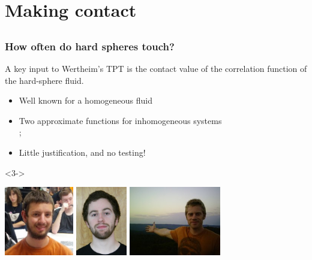 \section{Making contact}
\subsection*{}
\begin{frame}
  \frametitle{How often do hard spheres touch?}  A key input to
  Wertheim's TPT is the contact value of the correlation function of
  the hard-sphere fluid.
  \begin{itemize}
  \item<2-> Well known for a homogeneous fluid
  \item<2-> Two approximate functions for inhomogeneous systems
    \\ \hfill {}\tiny ;
  \item<2-> Little justification, and no testing!
  \end{itemize}
  \begin{block}{}<3->
  \begin{center}
    \includegraphics[height=3cm]{figs/HaglundChris}
    \includegraphics[height=3cm]{figs/KreitzbergPatrick}
    \includegraphics[height=3cm]{figs/SchulteJeff}
  \end{center}
  \end{block}
\end{frame}

